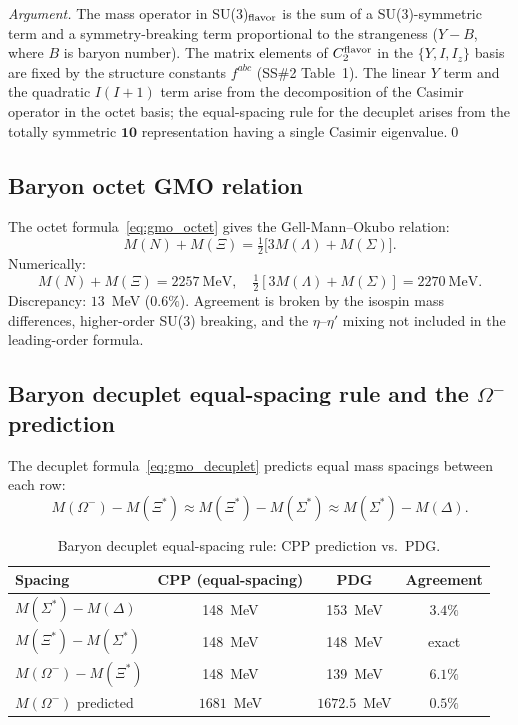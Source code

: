 \documentclass[11pt,a4paper]{article}
\begin{document}
\begin{proof}[Argument]
The mass operator in SU(3)$_{\rm flavor}$ is the sum of a
SU(3)-symmetric term and a symmetry-breaking term proportional
to the strangeness ($Y - B$, where $B$ is baryon number).
The matrix elements of $C_2^{\rm flavor}$ in the $\{Y, I, I_z\}$
basis are fixed by the structure constants $f^{abc}$
(SS\#2 Table~1).  The linear $Y$ term and the quadratic $I(I+1)$
term arise from the decomposition of the Casimir operator in the
octet basis; the equal-spacing rule for the decuplet arises from
the totally symmetric $\mathbf{10}$ representation having a
single Casimir eigenvalue.\qed
\end{proof}

\subsection{Baryon octet GMO relation}

The octet formula~\eqref{eq:gmo_octet} gives the Gell-Mann--Okubo
relation:
\begin{equation}
M(N) + M(\Xi) = \tfrac{1}{2}\bigl[3M(\Lambda) + M(\Sigma)\bigr].
\label{eq:gmo_octet_relation}
\end{equation}
Numerically:
\begin{equation}
M(N) + M(\Xi) = 2257~\text{MeV},\quad
\tfrac{1}{2}[3M(\Lambda) + M(\Sigma)] = 2270~\text{MeV}.
\label{eq:gmo_numbers}
\end{equation}
Discrepancy: $13$~MeV ($0.6\%$).  Agreement is broken by the
isospin mass differences, higher-order SU(3) breaking, and
the $\eta$--$\eta'$ mixing not included in the leading-order
formula.

\subsection{Baryon decuplet equal-spacing rule and the $\Omega^-$ prediction}

The decuplet formula~\eqref{eq:gmo_decuplet} predicts equal
mass spacings between each row:
\begin{equation}
M(\Omega^-) - M(\Xi^*) \approx M(\Xi^*) - M(\Sigma^*)
\approx M(\Sigma^*) - M(\Delta).
\label{eq:equalspacing}
\end{equation}

\begin{table}[H]
\centering
\caption{Baryon decuplet equal-spacing rule: CPP prediction vs.\ PDG.}
\label{tab:decuplet}
\begin{tabular}{@{}lccc@{}}
\toprule
Spacing & CPP (equal-spacing) & PDG & Agreement \\
\midrule
$M(\Sigma^*) - M(\Delta)$ & 148~MeV & 153~MeV & $3.4\%$ \\
$M(\Xi^*) - M(\Sigma^*)$  & 148~MeV & 148~MeV & exact \\
$M(\Omega^-) - M(\Xi^*)$  & 148~MeV & 139~MeV & $6.1\%$ \\
$M(\Omega^-)$ predicted   & $1681$~MeV & $1672.5$~MeV & $\mathbf{0.5\%}$ \\
\bottomrule
\end{tabular}
\end{table}
\end{document}
